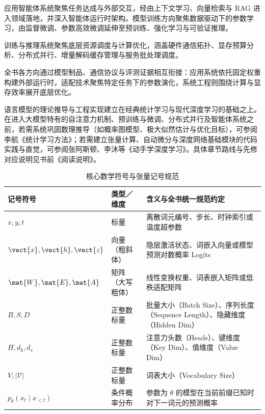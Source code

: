 \documentclass[../textbook.tex]{subfiles}
\begin{document}
应用智能体系统聚焦任务达成与外部交互，经由上下文学习、向量检索与 RAG 进入领域落地，并深入智能体运行时架构。模型训练方向聚焦数据驱动下的参数学习，由监督微调、参数高效微调延伸至预训练、强化学习与可验证推理。

训练与推理系统聚焦底层资源调度与计算优化，涵盖硬件通信拓扑、显存预算分析、分布式并行、增量解码缓存管理与服务批处理调度。

全书各方向通过模型制品、通信协议与评测证据相互衔接：应用系统依托固定权重构建外部运行时，适配技术聚焦特定任务下的参数演化，系统工程则围绕计算与显存效率展开底层优化。

语言模型的理论推导与工程实现建立在经典统计学习与现代深度学习的基础之上。在进入大模型特有的自注意力机制、预训练与微调、分布式并行及智能体系统之前，若需系统巩固数理推导（如概率图模型、极大似然估计与优化目标），可参阅李航《统计学习方法》\cite{LiTongJiXueXiFangFaDi2Ban2019}；若需建立张量计算、自动微分与深度网络基础模块的代码实践与直觉，可参阅张阿斯顿、李沐等《动手学深度学习》\cite{zhangDiveDeepLearning2022}。具体章节路线与先修对应说明见书前《阅读说明》。

\begin{table}[htbp]
\centering
\caption{核心数学符号与张量记号规范}\label{tab:intro-notations}
\begin{tabularx}{\linewidth}{@{}l p{30mm} X@{}}
\toprule
记号符号 & 类型／维度 & 含义与全书统一规范约定 \\\midrule
$x, y, t$ & 标量 & 离散词元编号、步长、时钟索引或温度超参数 \\
$\vect{x}, \vect{h}, \vect{z}$ & 向量（粗斜体） & 隐层激活状态、词嵌入向量或模型预测对数概率 Logits \\
$\mat{W}, \mat{E}, \mat{A}$ & 矩阵（大写粗体） & 线性变换权重、词表嵌入矩阵或低秩适配矩阵 \\
$B, S, D$ & 正整数标量 & 批量大小（Batch Size）、序列长度（Sequence Length）、隐藏维度（Hidden Dim） \\
$H, d_k, d_v$ & 正整数标量 & 注意力头数（Heads）、键维度（Key Dim）、值维度（Value Dim） \\
$V, |\mathcal{V}|$ & 正整数标量 & 词表大小（Vocabulary Size） \\
$p_\theta(x_t \mid x_{<t})$ & 条件概率分布 & 参数为 $\theta$ 的模型在当前前缀已知时对下一词元的预测概率 \\
\bottomrule
\end{tabularx}
\end{table}

\chapterreferences
\myendchapterdocument
\end{document}
